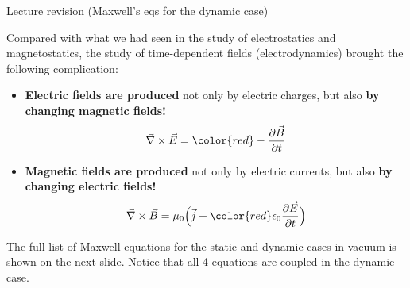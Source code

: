 \begin{frame}{Lecture \summarizedlecture revision (Maxwell's eqs for the dynamic case)}

Compared with what we had seen in the study of electrostatics and magnetostatics,
the study of time-dependent fields (electrodynamics) brought the following complication:\\

\vspace{0.1cm}

\begin{itemize}
   \item {\bf Electric fields are produced} not only by electric charges,
             but also {\bf by changing magnetic fields!}
     \begin{equation*}
        \vec{\nabla} \times \vec{E} = {\color{red} - \frac{\partial \vec{B}}{\partial t}}
     \end{equation*}

   \item {\bf Magnetic fields are produced} not only by electric currents,
             but also {\bf by changing electric fields!}
     \begin{equation*}
         \vec{\nabla} \times \vec{B} = \mu_{0} \Big( \vec{j} + {\color{red} \epsilon_0 \frac{\partial \vec{E}}{\partial t} } \Big)
     \end{equation*}
\end{itemize}

{\small
The full list of Maxwell equations for the static and dynamic cases in vacuum is shown on the next slide.
Notice that all 4 equations are coupled in the dynamic case.\\
}

\end{frame}

%
%
%

